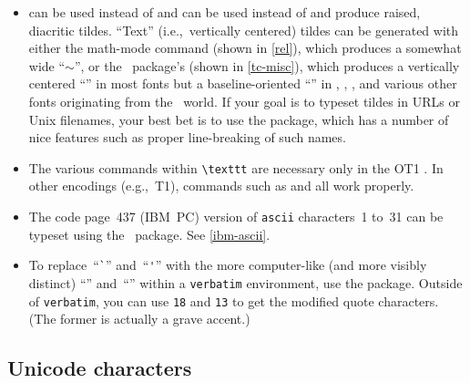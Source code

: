 \begin{itemize}
  \item \label{page:tildes}  
  can be used instead of 
  and
   can be used instead of
   and 
  produce raised, diacritic tildes.  ``Text''
  (i.e.,~vertically centered)
  tildes can be generated with either the math-mode 
  command (shown in \vref{rel}), which produces a somewhat wide
  ``$\sim$'', or the \TC\ package's  (shown in
  \vref{tc-misc}), which produces a vertically centered
  ``{\selectfont\texttildelow}'' in most fonts but a
  baseline-oriented ``\texttildelow'' in ,
  \TX, \PX, and various other fonts originating from the
  \tex\ world.  If your goal is to typeset tildes in URLs or Unix
  filenames, your best bet is to use the  package,
  which has a number of nice features such as proper line-breaking
  of such names.

  \item The various \cmd{\char} commands within \verb|\texttt| are
  necessary only in the OT1 \fntenc[OT1].  In other encodings
  (e.g.,~T1), commands such as 
  and  all work properly.

  \item The code page~437 (IBM~PC)
  version of \texttt{ascii} characters~1 to~31 can be typeset
  using the \ASCII\ package.
\ifASCII
  See \vref{ibm-ascii}.
\fi

  \item To replace~``\verb|`|'' and~``\verb|'|'' with the more
  computer-like (and more visibly distinct) ``\texttt{}''
  and~``\texttt{}'' within a \texttt{verbatim} environment,
  use the  package.  Outside of \texttt{verbatim},
  you can use \cmd{\char}\texttt{18} and \cmd{\char}\texttt{13} to
  get the modified quote characters.  (The former is actually a
  grave accent.)
\end{itemize}





\subsection{Unicode characters}
\label{unicode-chars}

